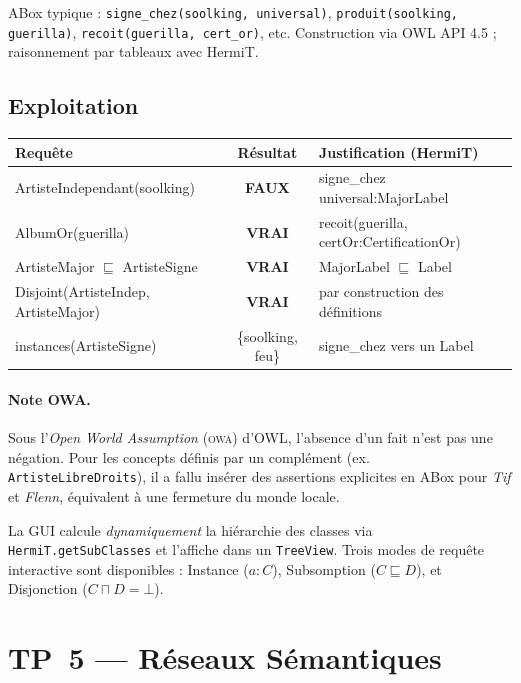 \documentclass[11pt, a4paper]{article}
\newcommand{\code}[1]{\texttt{#1}}
\newcommand{\sq}{\sqsubseteq}
\begin{document}
\noindent ABox typique : \code{signe\_chez(soolking, universal)},
\code{produit(soolking, guerilla)}, \code{recoit(guerilla, cert\_or)}, etc.
Construction via OWL API 4.5 ; raisonnement par tableaux avec HermiT.

\subsection*{Exploitation}

\begin{center}\small
\begin{tabularx}{\linewidth}{lcX}
\toprule
\textbf{Requête} & \textbf{Résultat} & \textbf{Justification (HermiT)} \\
\midrule
ArtisteIndependant(soolking)        & \textbf{FAUX} & signe\_chez universal:MajorLabel \\
AlbumOr(guerilla)                   & \textbf{VRAI} & recoit(guerilla, certOr:CertificationOr) \\
ArtisteMajor $\sq$ ArtisteSigne     & \textbf{VRAI} & MajorLabel $\sq$ Label \\
Disjoint(ArtisteIndep, ArtisteMajor) & \textbf{VRAI} & par construction des définitions \\
instances(ArtisteSigne)             & \{soolking, feu\} & signe\_chez vers un Label \\
\bottomrule
\end{tabularx}
\end{center}

\paragraph{Note OWA.} Sous l'\emph{Open World Assumption} (\textsc{owa}) d'OWL,
l'absence d'un fait n'est pas une négation. Pour les concepts définis par un
complément (ex. \code{ArtisteLibreDroits}), il a fallu insérer des assertions
explicites en ABox pour \emph{Tif} et \emph{Flenn}, équivalent à une fermeture
du monde locale.

\noindent La GUI calcule \emph{dynamiquement} la hiérarchie des classes via
\code{HermiT.getSubClasses} et l'affiche dans un \code{TreeView}. Trois modes
de requête interactive sont disponibles : Instance ($a:C$), Subsomption
($C \sq D$), et Disjonction ($C \sqcap D = \bot$).

\newpage
\section{TP~5 --- Réseaux Sémantiques}
\end{document}
